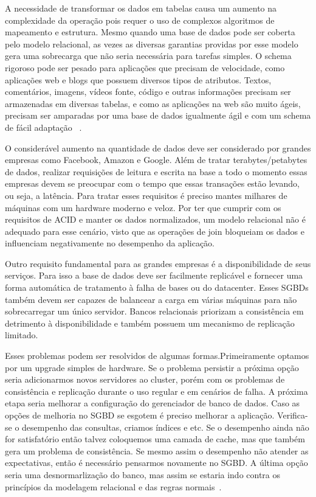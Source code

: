 A necessidade de transformar os dados em tabelas causa um aumento na complexidade da operação pois requer o uso de complexos algoritmos de mapeamento e estrutura. Mesmo quando uma base de dados pode ser coberta pelo modelo relacional, as vezes as diversas garantias providas por esse modelo gera uma sobrecarga que não seria necessária para tarefas simples. O schema rigoroso pode ser pesado para aplicações que precisam de velocidade, como aplicações web e blogs que possuem diversos tipos de atributos. Textos, comentários, imagens, vídeos fonte, código e outras informações precisam ser armazenadas em diversas tabelas, e como as aplicações na web são muito ágeis, precisam ser amparadas por uma base de dados igualmente ágil e com um schema de fácil adaptação ~\cite{nosqlevaluation}.

O considerável aumento na quantidade de dados deve ser considerado por grandes empresas como Facebook, Amazon e Google. Além de tratar terabytes/petabytes de dados, realizar requisições de leitura e escrita na base a todo o momento essas empresas devem se preocupar com o tempo que essas transações estão levando, ou seja, a latência. Para tratar esses requisitos é preciso mantes milhares de máquinas com um hardware moderno e veloz. Por ter que cumprir com os requisitos de ACID e manter os dados normalizados, um modelo relacional não é adequado para esse cenário, visto que as operações de join bloqueiam os dados e influenciam negativamente no desempenho da aplicação.

Outro requisito fundamental para as grandes empresas é a disponibilidade de seus serviços. Para isso a base de dados deve ser facilmente replicável e fornecer uma forma automática de tratamento à falha de bases ou do datacenter. Esses SGBDs também devem ser capazes de balancear a carga em várias máquinas para não sobrecarregar um único servidor. Bancos relacionais priorizam a consistência em detrimento à disponibilidade e também possuem um mecanismo de replicação limitado.

Esses problemas podem ser resolvidos de algumas formas.Primeiramente optamos por um upgrade simples de hardware. Se o problema persistir a próxima opção seria adicionarmos novos servidores ao cluster, porém com os problemas de consistência e replicação durante o uso regular e em cenários de falha. A próxima etapa seria melhorar a configuração do gerenciador de banco de dados. Caso as opções de melhoria no SGBD se esgotem é preciso melhorar a aplicação. Verifica-se o desempenho das consultas, criamos índices e etc. Se o desempenho ainda não for satisfatório então talvez coloquemos uma camada de cache, mas que também gera um problema de consistência. Se mesmo assim o desempenho não atender as expectativas, então é necessário pensarmos novamente no SGBD. A última opção seria uma desnormarlização do banco, mas assim se estaria indo contra os princípios da modelagem relacional e das regras normais~\cite{cassandraguide}.

